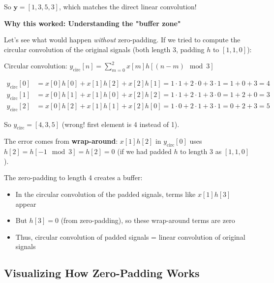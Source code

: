 \begin{notechapter}
\begin{example}
So $\mathbf{y} = [1, 3, 5, 3]$, which matches the direct linear convolution!

\vspace{0.3cm}
\textbf{Why this worked: Understanding the "buffer zone"}

Let's see what would happen \emph{without} zero-padding. If we tried to compute the 
circular convolution of the original signals (both length 3, padding $h$ to $[1, 1, 0]$):

Circular convolution: $y_{\text{circ}}[n] = \sum_{m=0}^{2} x[m] h[(n-m) \mod 3]$

\begin{align*}
y_{\text{circ}}[0] &= x[0]h[0] + x[1]h[2] + x[2]h[1] = 1\cdot1 + 2\cdot0 + 3\cdot1 = 1 + 0 + 3 = 4 \\
y_{\text{circ}}[1] &= x[0]h[1] + x[1]h[0] + x[2]h[2] = 1\cdot1 + 2\cdot1 + 3\cdot0 = 1 + 2 + 0 = 3 \\
y_{\text{circ}}[2] &= x[0]h[2] + x[1]h[1] + x[2]h[0] = 1\cdot0 + 2\cdot1 + 3\cdot1 = 0 + 2 + 3 = 5
\end{align*}

So $y_{\text{circ}} = [4, 3, 5]$ (wrong! first element is 4 instead of 1).

The error comes from \textbf{wrap-around}: $x[1]h[2]$ in $y_{\text{circ}}[0]$ uses
$h[2]=h[-1 \mod 3]=h[2]=0$ 
(if we had padded $h$ to length 3 as $[1, 1, 0]$).

The zero-padding to length 4 creates a buffer:
\begin{itemize}
    \item In the circular convolution of the padded signals, terms like $x[1]h[3]$ appear
    \item But $h[3] = 0$ (from zero-padding), so these wrap-around terms are zero
    \item Thus, circular convolution of padded signals = linear convolution of original signals
\end{itemize}

\end{example}

\subsection{Visualizing How Zero-Padding Works}

\begin{figure}[H]
\centering
{}
\end{figure}
\end{notechapter}
